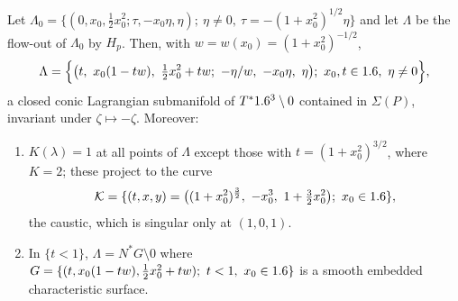 \begin{proposition}\label{hj:prop:keller}
  Let $\Lambda_0=\{(0,x_0,\frac12x_0^2;\tau,-x_0\eta,\eta);\ \eta\neq0,\
  \tau=-(1+x_0^2)^{1/2}\eta\}$ and let $\Lambda$ be the flow-out of $\Lambda_0$ by
  $H_p$.  Then, with $w=w(x_0)=(1+x_0^2)^{-1/2}$,
  \begin{equation}\label{hj:eq:keller-Lambda}
    \Lambda=\Big\{\big(t,\ x_0(1-tw),\ \tfrac12x_0^2+tw;\ -\eta/w,\ -x_0\eta,\
    \eta\big);\ x_0,t\in\R,\ \eta\neq0\Big\},
  \end{equation}
  a closed conic Lagrangian submanifold of $T^*1.6^3\setminus0$ contained in
  $\Sigma(P)$, invariant under $\zeta\mapsto-\zeta$.  Moreover:
  \begin{enumerate}[label=(\roman*)]
  \item $K(\lambda)=1$ at all points of $\Lambda$ except those with
    $t=(1+x_0^2)^{3/2}$, where $K=2$; these project to the curve
    \begin{equation*}
      \mathcal K=\{(t,x,y)=\big((1+x_0^2)^{\frac32},\ -x_0^3,\ 1+\tfrac32x_0^2\big);\
      x_0\in1.6\},
    \end{equation*}
    the caustic, which is singular only at $(1,0,1)$.
  \item In $\{t<1\}$, $\Lambda=N^*G\setminus0$ where $G=\{(t,x_0(1-tw),
    \frac12x_0^2+tw);\ t<1,\ x_0\in1.6\}$ is a smooth embedded characteristic
    surface.
  \end{enumerate}
\end{proposition}
